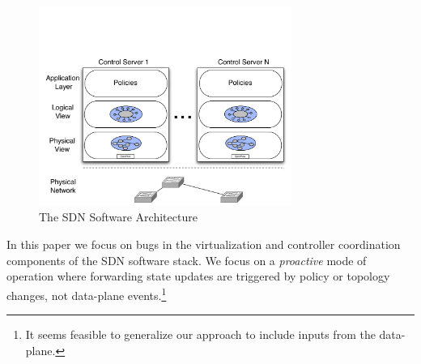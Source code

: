 
\begin{figure}[t]
    \includegraphics[width=3.25in]{../diagrams/architecture/SDN_Stack.pdf}
    \caption[]{\label{fig:basicarch} The SDN Software Architecture }
\end{figure}

In this paper we focus on bugs in the virtualization and controller coordination
components of the SDN software stack. We focus on a \emph{proactive} mode of
operation where forwarding state updates are triggered by policy or topology
changes, not data-plane events.\footnote{It seems feasible to generalize our
approach to include inputs from the data-plane.}

